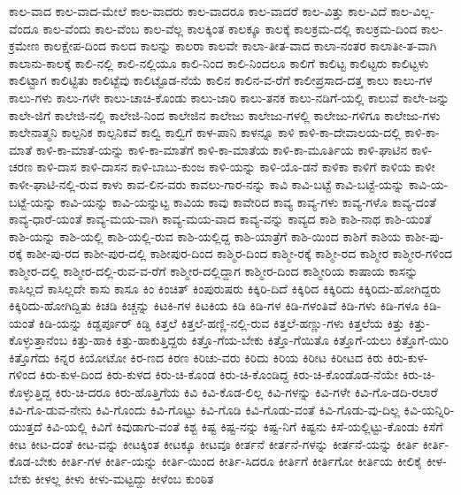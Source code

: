 {ಕಾಲ-ವಾದ
ಕಾಲ-ವಾದ-ಮೇಲೆ
ಕಾಲ-ವಾದರು
ಕಾಲ-ವಾದರೂ
ಕಾಲ-ವಾದರೆ
ಕಾಲ-ವಿತ್ತು
ಕಾಲ-ವಿದೆ
ಕಾಲ-ವಿಲ್ಲ-ವೆಂದೂ
ಕಾಲ-ವೆಂದು
ಕಾಲ-ವೆಂಬ
ಕಾಲ-ವೆಲ್ಲ
ಕಾಲಕ್ಕಿಂತ
ಕಾಲಕ್ಕೂ
ಕಾಲಕ್ಕೆ
ಕಾಲಕ್ರಮ-ದಲ್ಲಿ
ಕಾಲಕ್ರಮ-ದಿಂದ
ಕಾಲ-ಕ್ರಮೇಣ
ಕಾಲಕ್ಷೇಪ-ದಿಂದ
ಕಾಲದ
ಕಾಲನ್ನು
ಕಾಲರಾ
ಕಾಲವೇ
ಕಾಲಾ-ತೀತ-ವಾದ
ಕಾಲಾ-ನಂತರ
ಕಾಲಾತೀ-ತ-ವಾಗಿ
ಕಾಲಾನು-ಕಾಲಕ್ಕೆ
ಕಾಲಿ-ನಲ್ಲಿ
ಕಾಲಿ-ನಲ್ಲಿಯೂ
ಕಾಲಿ-ನಿಂದ
ಕಾಲಿ-ನಿಂದಲೂ
ಕಾಲಿಗೆ
ಕಾಲಿಟ್ಟ
ಕಾಲಿಟ್ಟರು
ಕಾಲಿಟ್ಟಳು
ಕಾಲಿಟ್ಟಾಗ
ಕಾಲಿಟ್ಟಿತು
ಕಾಲಿಟ್ಟೆವು
ಕಾಲಿಟ್ಟೊಡ-ನೆಯೆ
ಕಾಲಿನ
ಕಾಲಿನ-ವ-ರೆಗೆ
ಕಾಲೀಪ್ರಸಾದ-ದತ್ತ
ಕಾಲು
ಕಾಲು-ಗಳ
ಕಾಲು-ಗಳು
ಕಾಲು-ಗಳೇ
ಕಾಲು-ಚಾಚಿ-ಕೊಂಡು
ಕಾಲು-ಜಾರಿ
ಕಾಲು-ತನಕ
ಕಾಲು-ನಡಿಗೆ-ಯಲ್ಲಿ
ಕಾಲುವೆ
ಕಾಲೇ-ಜನ್ನು
ಕಾಲೇ-ಜಿಗೆ
ಕಾಲೇಜಿ-ನಲ್ಲಿ
ಕಾಲೇಜಿ-ನಿಂದ
ಕಾಲೇಜಿನ
ಕಾಲೇಜು
ಕಾಲೇಜು-ಗಳಲ್ಲಿ
ಕಾಲೇಜು-ಗಳಿಗೂ
ಕಾಲೇಜು-ಗಳು
ಕಾಲೇನಾತ್ಮನಿ
ಕಾಲ್ಪನಿಕ
ಕಾಲ್ಪನಿಕವೆ
ಕಾಲ್ವಿ
ಕಾಲ್ವಿಗೆ
ಕಾಳ-ಪಾನಿ
ಕಾಳನ್ನೂ
ಕಾಳಿ
ಕಾಳಿ-ಕಾ-ದೇವಾಲಯ-ದಲ್ಲಿ
ಕಾಳಿ-ಕಾ-ಮಾತೆ
ಕಾಳಿ-ಕಾ-ಮಾತೆ-ಯನ್ನು
ಕಾಳಿ-ಕಾ-ಮಾತೆಗೆ
ಕಾಳಿ-ಕಾ-ಮಾತೆಯ
ಕಾಳಿ-ಕಾ-ಮೂರ್ತಿಯ
ಕಾಳಿ-ಘಾಟಿನ
ಕಾಳಿ-ಚರಣ
ಕಾಳಿ-ದಾಸ
ಕಾಳಿ-ದಾಸನ
ಕಾಳಿ-ಬಾಬು-ಕುಂಜ
ಕಾಳಿ-ಯನ್ನು
ಕಾಳಿ-ಯೊ-ಡನೆ
ಕಾಳಿಕಾ
ಕಾಳಿಗೆ
ಕಾಳಿಯ
ಕಾಳೀ
ಕಾಳೀ-ಘಾಟಿ-ನಲ್ಲಿ-ರುವ
ಕಾಳು
ಕಾವ-ಲಿನ-ವರು
ಕಾವಲು-ಗಾರ-ನನ್ನು
ಕಾವಿ
ಕಾವಿ-ಬಟ್ಟೆ
ಕಾವಿ-ಬಟ್ಟೆ-ಯನ್ನು
ಕಾವಿ-ಯ-ಬಟ್ಟೆ-ಯನ್ನು
ಕಾವಿ-ಯನ್ನು
ಕಾವಿ-ಯನ್ನುಟ್ಟ
ಕಾವಿಯ
ಕಾವು
ಕಾವೇರಿದ
ಕಾವ್ಯ
ಕಾವ್ಯ-ಗಳು
ಕಾವ್ಯ-ಗಳೊ
ಕಾವ್ಯ-ದಂತೆ
ಕಾವ್ಯ-ಧಾರೆ-ಯಂತೆ
ಕಾವ್ಯ-ಮಯ-ವಾಗಿ
ಕಾವ್ಯ-ಮಯ-ವಾದ
ಕಾವ್ಯ-ವನ್ನು
ಕಾವ್ಯದ
ಕಾಶಿ
ಕಾಶಿ-ನಾಥ
ಕಾಶಿ-ಯಂತೆ
ಕಾಶಿ-ಯನ್ನು
ಕಾಶಿ-ಯಲ್ಲಿ
ಕಾಶಿ-ಯಲ್ಲಿ-ರುವ
ಕಾಶಿ-ಯಲ್ಲಿದ್ದ
ಕಾಶಿ-ಯಾತ್ರೆಗೆ
ಕಾಶಿ-ಯಿಂದ
ಕಾಶಿಗೆ
ಕಾಶಿಯ
ಕಾಶೀ-ಪು-ರಕ್ಕೆ
ಕಾಶೀ-ಪು-ರದ
ಕಾಶೀ-ಪುರ-ದಲ್ಲಿ
ಕಾಶೀಪುರ-ದಿಂದ
ಕಾಶ್ಮಿರ-ದಿಂದ
ಕಾಶ್ಮೀ-ರಕ್ಕೆ
ಕಾಶ್ಮೀ-ರದ
ಕಾಶ್ಮೀರ
ಕಾಶ್ಮೀರ-ಗಳಿಂದ
ಕಾಶ್ಮೀರ-ದಲ್ಲಿ
ಕಾಶ್ಮೀರ-ದಲ್ಲಿ-ರುವ-ವ-ರೆಗೆ
ಕಾಶ್ಮೀರ-ದಲ್ಲಿದ್ದಾಗ
ಕಾಶ್ಮೀರ-ದಿಂದ
ಕಾಶ್ಮೀರಿಯ
ಕಾಷಾಯ
ಕಾಸನ್ನು
ಕಾಸಿಲ್ಲದೆ
ಕಾಸಿಲ್ಲದೇ
ಕಾಸು
ಕಾಸೂ
ಕಿಂ
ಕಿಂಚಿತ್
ಕಿಂಪುರುಷರು
ಕಿಕ್ಕಿರಿ-ದಿದೆ
ಕಿಕ್ಕಿರಿದ
ಕಿಕ್ಕಿರಿದು
ಕಿಕ್ಕಿರಿದು-ಹೋಗಿದ್ದರು
ಕಿಕ್ಕಿರಿದು-ಹೋಗಿದ್ದಿತು
ಕಿಚಡಿ
ಕಿಚ್ಚನ್ನು
ಕಿಟಕಿ-ಗಳ
ಕಿಟಕಿಯ
ಕಿಡಿ
ಕಿಡಿ-ಗಳ
ಕಿಡಿ-ಗಳಂತಿವೆ
ಕಿಡಿ-ಗಳು
ಕಿಡಿ-ಗಳೂ
ಕಿಡಿ-ಯಂತೆ
ಕಿಡಿ-ಯನ್ನು
ಕಿಡ್ಡರ್ಪೂರ್
ಕಿಡ್ಡಿ
ಕಿತ್ತಲೆ
ಕಿತ್ತಲೆ-ಹಣ್ಣಿ-ನಲ್ಲಿ-ರುವ
ಕಿತ್ತಲೆ-ಹಣ್ಣು-ಗಳು
ಕಿತ್ತಲೆಯ
ಕಿತ್ತು
ಕಿತ್ತು-ಕೊಳ್ಳುತ್ತಾನೆಂಬ
ಕಿತ್ತು-ಹಾಕಿ
ಕಿತ್ತು-ಹಾಕುತ್ತಿದ್ದರು
ಕಿತ್ತೊ-ಗೆಯ-ಬೇಕು
ಕಿತ್ತೊ-ಗೆಯಿತೊ
ಕಿತ್ತೊಗೆ-ಯಲು
ಕಿತ್ತೊಗೆ-ಯಿರಿ
ಕಿತ್ತೊಗೆದು
ಕಿನ್ನರ
ಕಿಯೋಟೋ
ಕಿರ-ಣದ
ಕಿರಣ
ಕಿರಿಚು-ವರು
ಕಿರಿದು
ಕಿರಿಯ
ಕಿರೀಟ
ಕಿರೀಟದ
ಕಿರು
ಕಿರು-ಕುಳ-ಗಳಿಂದ
ಕಿರು-ಕುಳ-ದಿಂದ
ಕಿರು-ಕುಳದ
ಕಿರು-ಚಿ-ಕೊಂಡ
ಕಿರು-ಚಿ-ಕೊಂಡಿದ್ದ
ಕಿರು-ಚಿ-ಕೊಂಡೊಡ-ನೆಯೇ
ಕಿರು-ಚಿ-ಕೊಳ್ಳುತ್ತಿದ್ದ
ಕಿರು-ಚಿ-ದರೂ
ಕಿರು-ಹೊತ್ತಿಗೆಯ
ಕಿವಿ
ಕಿವಿ-ಕೊಡ-ಲಿಲ್ಲ
ಕಿವಿ-ಗಳನ್ನು
ಕಿವಿ-ಗಳೇ
ಕಿವಿ-ಗೊ-ಡದಿ-ರಲಾರೆ
ಕಿವಿ-ಗೊ-ಡುವ-ನೇನು
ಕಿವಿ-ಗೊಂದು
ಕಿವಿ-ಗೊಟ್ಟು
ಕಿವಿ-ಗೊಡಿ
ಕಿವಿ-ಗೊಡು-ವಂತೆ
ಕಿವಿ-ಗೊಡು-ವು-ದಿಲ್ಲ
ಕಿವಿ-ಯನ್ನಿರಿ-ಯುತ್ತದೆ
ಕಿವಿ-ಯಲ್ಲಿ
ಕಿವಿಗೆ
ಕಿವುಡಾಗು-ವಂತೆ
ಕಿಶ್ಟ
ಕಿಷ್ಟ
ಕಿಷ್ಟ-ನನ್ನು
ಕಿಷ್ಟ-ನಿಗೆ
ಕಿಷ್ಟನು
ಕಿಸೆ-ಯಲ್ಲಿಟ್ಟು-ಕೊಂಡು
ಕಿಸೆಗೆ
ಕೀಟ
ಕೀಟ-ದಂತೆ
ಕೀಟ-ವನ್ನು
ಕೀಟಕ್ಕಿಂತ
ಕೀಟಕ್ಕೂ
ಕೀಟವೂ
ಕೀರ್ತನೆ
ಕೀರ್ತನೆ-ಗಳನ್ನು
ಕೀರ್ತನೆ-ಯನ್ನು
ಕೀರ್ತಿ
ಕೀರ್ತಿ-ಕೊಡ-ಬೇಕು
ಕೀರ್ತಿ-ಗಳ
ಕೀರ್ತಿ-ಯನ್ನು
ಕೀರ್ತಿ-ಯಿಂದ
ಕೀರ್ತಿ-ಸಿದರೂ
ಕೀರ್ತಿಗೆ
ಕೀರ್ತಿಗೋ
ಕೀರ್ತಿಯ
ಕೀಲಿಕೈ
ಕೀಳ-ಬೇಕು
ಕೀಳಲ್ಲ
ಕೀಳು
ಕೀಳು-ಮಟ್ಟದ್ದು
ಕೀಳೆಂಬ
ಕುಂಠಿತ
}
